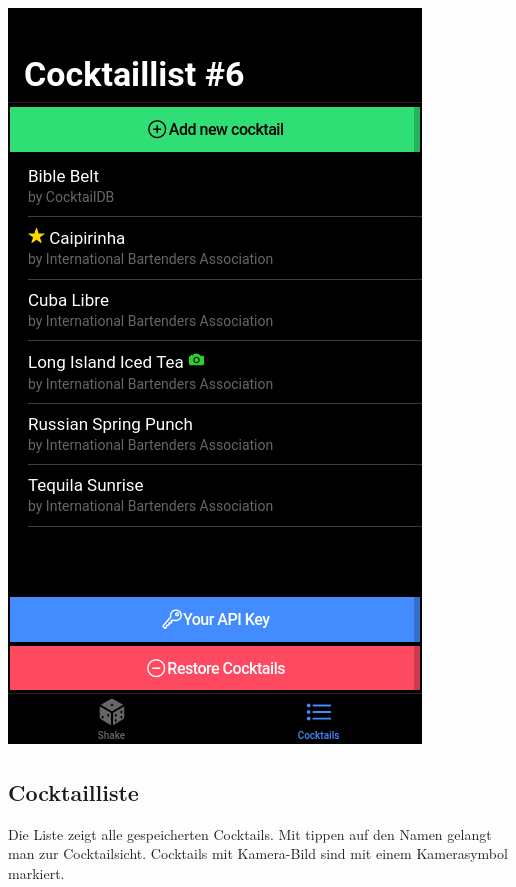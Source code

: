 \documentclass[a4paper, 10pt]{article}
\begin{document}
\begin{multicols}{4}
    \begin{center}
        \includegraphics[width=.8\linewidth]{CocktailList-1.png}
    \end{center}
    \columnbreak
    \subsection{Cocktailliste}
    Die Liste zeigt alle gespeicherten Cocktails. Mit tippen auf den Namen gelangt man zur Cocktailsicht. Cocktails mit Kamera-Bild sind mit einem Kamerasymbol markiert.
    \columnbreak


\end{multicols}
\end{document}
